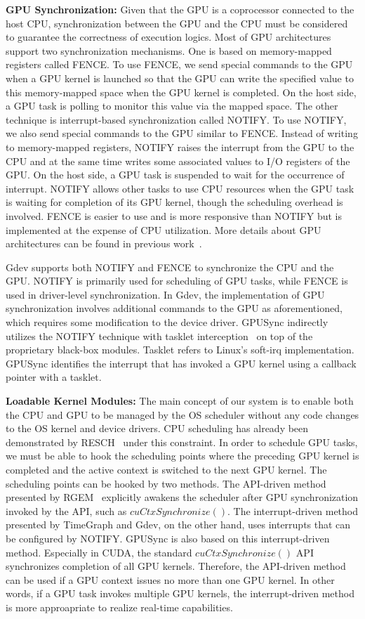 \textbf{GPU Synchronization:}
Given that the GPU is a coprocessor connected to the host CPU,
synchronization between the GPU and the CPU must be considered to
guarantee the correctness of execution logics.
Most of GPU architectures support two synchronization mechanisms.
One is based on memory-mapped registers called FENCE.
To use FENCE, we send special commands to the GPU when a GPU kernel is
launched so that the GPU can write the specified value to this
memory-mapped space when the GPU kernel is completed. 
On the host side, a GPU task is polling to monitor this value via the
mapped space.
The other technique is interrupt-based synchronization called NOTIFY.
To use NOTIFY, we also send special commands to the GPU similar to
FENCE.
Instead of writing to memory-mapped registers, NOTIFY raises the
interrupt from the GPU to the CPU and at the same time writes some
associated values to I/O registers of the GPU.
On the host side, a GPU task is suspended to wait for the occurrence of
interrupt.
NOTIFY allows other tasks to use CPU resources when the GPU task is
waiting for completion of its GPU kernel, though the scheduling overhead
is involved.
FENCE is easier to use and is more responsive than NOTIFY but is
implemented at the expense of CPU utilization.
More details about GPU architectures can be found in previous
work~\cite{kato:timegraph, kato:gdev, fujii:apsys2013}.

Gdev supports both NOTIFY and FENCE to synchronize the CPU and the GPU.
NOTIFY is primarily used for scheduling of GPU tasks, while FENCE is
used in driver-level synchronization. 
In Gdev, the implementation of GPU synchronization involves additional
commands to the GPU as aforementioned, which requires some modification
to the device driver.
GPUSync indirectly utilizes the NOTIFY technique with tasklet
interception~\cite{elliott2012robust} on top of the proprietary
black-box modules.
Tasklet refers to Linux's soft-irq implementation.
GPUSync identifies the interrupt that has invoked a GPU kernel using a
callback pointer with a tasklet.

\textbf{Loadable Kernel Modules:}
The main concept of our system is to enable both the CPU and GPU to be
managed by the OS scheduler without any code changes to the OS kernel
and device drivers.
CPU scheduling has already been demonstrated by
RESCH~\cite{kato2009loadable, asberg2012exsched} under this constraint.
In order to schedule GPU tasks, we must be able to hook the scheduling
points where the preceding GPU kernel is completed and the active
context is switched to the next GPU kernel.
The scheduling points can be hooked by two methods.
The API-driven method presented by RGEM~\cite{kato:rgem} explicitly
awakens the scheduler after GPU synchronization invoked by the API, such
as $cuCtxSynchronize()$.
The interrupt-driven method presented by TimeGraph and Gdev, on the
other hand, uses interrupts that can be configured by NOTIFY.
GPUSync is also based on this interrupt-driven method.
Especially in CUDA, the standard $cuCtxSynchronize()$ API synchronizes
completion of all GPU kernels.
Therefore, the API-driven method can be used if a GPU context issues no
more than one GPU kernel.
In other words, if a GPU task invokes multiple GPU kernels, the
interrupt-driven method is more approapriate to realize real-time
capabilities.

